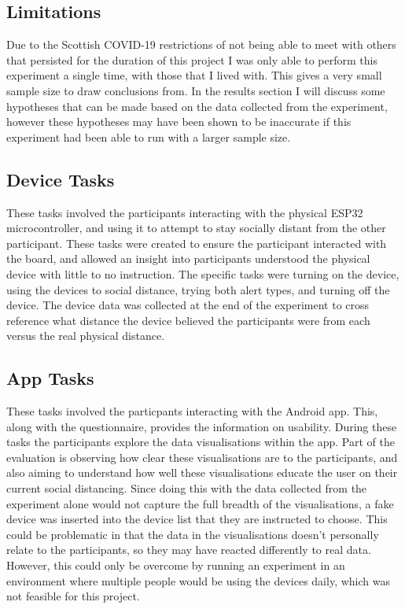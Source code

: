 \documentclass{l4proj}
\begin{document}
\subsection{Limitations}

Due to the Scottish COVID-19 restrictions of not being able to meet with others that persisted for the duration of this project I was only able to perform this experiment a single time, with those that I lived with. This gives a very small sample size to draw conclusions from. In the results section I will discuss some hypotheses that can be made based on the data collected from the experiment, however these hypotheses may have been shown to be inaccurate if this experiment had been able to run with a larger sample size.

\subsection{Device Tasks}

These tasks involved the participants interacting with the physical ESP32 microcontroller, and using it to attempt to stay socially distant from the other participant. These tasks were created to ensure the participant interacted with the board, and allowed an insight into participants understood the physical device with little to no instruction. The specific tasks were turning on the device, using the devices to social distance, trying both alert types, and turning off the device. The device data was collected at the end of the experiment to cross reference what distance the device believed the participants were from each versus the real physical distance.

\subsection{App Tasks}

These tasks involved the particpants interacting with the Android app. This, along with the questionnaire, provides the information on usability. During these tasks the participants explore the data visualisations within the app. Part of the evaluation is observing how clear these visualisations are to the participants, and also aiming to understand how well these visualisations educate the user on their current social distancing. Since doing this with the data collected from the experiment alone would not capture the full breadth of the visualisations, a fake device was inserted into the device list that they are instructed to choose. This could be problematic in that the data in the visualisations doesn't personally relate to the participants, so they may have reacted differently to real data. However, this could only be overcome by running an experiment in an environment where multiple people would be using the devices daily, which was not feasible for this project.
\end{document}
